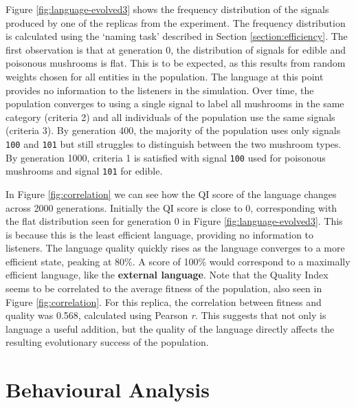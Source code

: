 \documentclass[12pt,a4paper]{report}
\begin{document}
Figure \ref{fig:language-evolved3} shows the frequency distribution of the signals produced by one of the replicas from the experiment. The frequency distribution is calculated using the `naming task' described in Section \ref{section:efficiency}. The first observation is that at generation 0, the distribution of signals for edible and poisonous mushrooms is flat. This is to be expected, as this results from random weights chosen for all entities in the population. The language at this point provides no information to the listeners in the simulation. Over time, the population converges to using a single signal to label all mushrooms in the same category (criteria 2) and all individuals of the population use the same signals (criteria 3). By generation 400, the majority of the population uses only signals \verb~100~ and \verb~101~ but still struggles to distinguish between the two mushroom types. By generation 1000, criteria 1 is satisfied with signal \verb~100~ used for poisonous mushrooms and signal \verb~101~ for edible. 

In Figure \ref{fig:correlation} we can see how the QI score of the language changes across 2000 generations. Initially the QI score is close to 0, corresponding with the flat distribution seen for generation 0 in Figure \ref{fig:language-evolved3}. This is because this is the least efficient language, providing no information to listeners. The language quality quickly rises as the language converges to a more efficient state, peaking at 80\%. A score of 100\% would correspond to a maximally efficient language, like the {\bf external language}. Note that the Quality Index seems to be correlated to the average fitness of the population, also seen in Figure \ref{fig:correlation}. For this replica, the correlation between fitness and quality was 0.568, calculated using Pearson \emph{r}. This suggests that not only is language a useful addition, but the quality of the language directly affects the resulting evolutionary success of the population.


\section{Behavioural Analysis}\label{section:behaviouranalysis}
\end{document}
